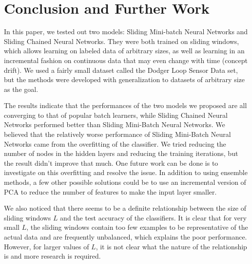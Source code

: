 \documentclass[conference]{IEEEtran}
\begin{document}
		\section{Conclusion and Further Work}
		\label{sec:conclusion}
		
		In this paper, we tested out two models: Sliding Mini-batch Neural Networks and Sliding Chained Neural Networks. They were both trained on sliding windows, which allows learning on labeled data of arbitrary sizes, as well as learning in an incremental fashion on continuous data that may even change with time (concept drift). We used a fairly small dataset called the Dodger Loop Sensor Data set, but the methods were developed with generalization to datasets of arbitrary size as the goal.
		
		The results indicate that the performances of the two models we proposed are all converging to that of popular batch learners, while Sliding Chained Neural Networks performed better than Sliding Mini-Batch Neural Networks. We believed that the relatively worse performance of  Sliding Mini-Batch Neural Networks came from the overfitting of the classifier. We tried reducing the number of nodes in the hidden layers and reducing the training iterations, but the result didn't improve that much. One future work can be done is to investigate on this overfitting and resolve the issue. In addition to using ensemble methods, a few other possible solutions could be to use an incremental version of PCA to reduce the number of features to make the input layer smaller.
		
		We also noticed that there seems to be a definite relationship between the size of sliding windows $L$ and the test accuracy of the classifiers. It is clear that for very small $L$, the sliding windows contain too few examples to be representative of the actual data and are frequently unbalanced, which explains the poor performance. However, for larger values of $L$, it is not clear what the nature of the relationship is and more research is required.
		
		
\end{document}
